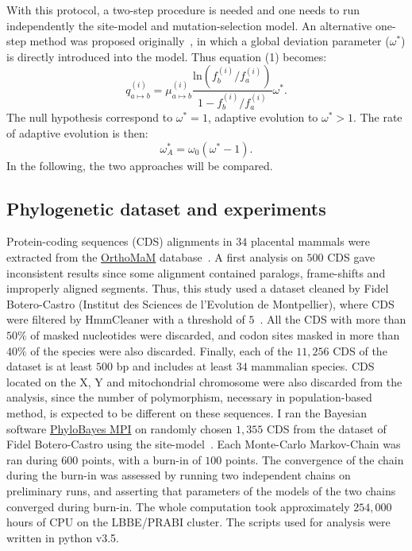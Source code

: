 \documentclass{article}
\begin{document}
With this protocol, a two-step procedure is needed and one needs to run independently the site-model and mutation-selection model.
An alternative one-step method was proposed originally~\citep{Rodrigue2016}, in which a global deviation parameter ($\omega^*$) is directly introduced into the model.
Thus equation (1) becomes:
\begin{equation}
q_{a \mapsto b}^{(i)} =  \mu_{a \mapsto b}^{(i)} \dfrac{\mathrm{ln}(f_b^{(i)} / f_a^{(i)})}{1 - f_b^{(i)} / f_a^{(i)}} \omega^* .
\end{equation}
The null hypothesis correspond to $\omega^*=1$, adaptive evolution to $\omega^*>1$.
The rate of adaptive evolution is then:
\begin{equation}
	\omega_A^* = \omega_0 (\omega^* - 1 ).
\end{equation}
In the following, the two approaches will be compared.

\subsection*{Phylogenetic dataset and experiments}
Protein-coding sequences (CDS) alignments in $34$ placental mammals were extracted from the \href{http://www.orthomam.univ-montp2.fr}{OrthoMaM} database~\citep{Ranwez2007, Douzery2014, Scornavacca2019}.
A first analysis on $500$ CDS gave inconsistent results since some alignment contained paralogs, frame-shifts and improperly aligned segments.
Thus, this study used a dataset cleaned by Fidel Botero-Castro (Institut des Sciences de l'Evolution de Montpellier), where CDS were filtered by HmmCleaner with a threshold of $5$~\citep{di_franco_detecting_2017}.
All the CDS with more than $50\%$ of masked nucleotides were discarded, and codon sites masked in more than $40\%$ of the species were also discarded.
Finally, each of the $11,256$ CDS of the dataset is at least $500$ bp and includes at least $34$ mammalian species.
CDS located on the X, Y and mitochondrial chromosome were also discarded from the analysis, since the number of polymorphism, necessary in population-based method, is expected to be different on these sequences.
I ran the Bayesian software \href{https://github.com/bayesiancook/pbmpi2}{PhyloBayes MPI} on randomly chosen $1,355$ CDS from the dataset of Fidel Botero-Castro using the site-model~\citep{Lartillot2013, Rodrigue2016}.
Each Monte-Carlo Markov-Chain was ran during $600$ points, with a burn-in of $100$ points.
The convergence of the chain during the burn-in was assessed by running two independent chains on preliminary runs, and asserting that parameters of the models of the two chains converged during burn-in.
The whole computation took approximately $254,000$ hours of CPU on the LBBE/PRABI cluster.
The scripts used for analysis were written in python v3.5.
\end{document}
